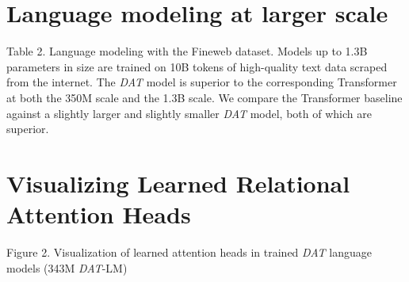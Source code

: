 \documentclass[a0,landscape,pdftex]{a0poster}
\begin{document}
\begin{minipage}{52cm}
\vskip -11cm
\section*{Language modeling at larger scale}

\begin{center}
    
\end{center}
{Table 2. Language modeling with the Fineweb dataset. Models up to 1.3B parameters in size are trained on 10B tokens of high-quality text data scraped from the internet. The \textit{DAT} model is superior to the corresponding Transformer at both the 350M scale and the 1.3B scale. We compare the Transformer baseline against a slightly larger and slightly smaller \textit{DAT} model, both of which are superior.}

\section*{Visualizing Learned Relational Attention Heads}
{Figure 2. Visualization of learned attention heads in trained \textit{DAT} language models (343M \textit{DAT}-LM)}
\begin{center}


\end{center}
\end{minipage}
\end{document}
